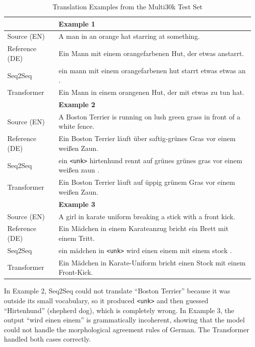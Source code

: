 \documentclass[12pt,a4paper]{article}
\begin{document}
\begin{table}[H]
    \centering
    \caption{Translation Examples from the Multi30k Test Set}
    \begin{tabular}{lp{9.5cm}}
        \toprule
        & \textbf{Example 1} \\
        \midrule
        Source (EN)    & A man in an orange hat starring at something. \\
        Reference (DE) & Ein Mann mit einem orangefarbenen Hut, der etwas anstarrt. \\
        Seq2Seq        & ein mann mit einem orangefarbenen hut starrt etwas etwas an . \\
        Transformer    & Ein Mann in einem orangenen Hut, der mit etwas zu tun hat. \\
        \midrule
        & \textbf{Example 2} \\
        \midrule
        Source (EN)    & A Boston Terrier is running on lush green grass in front of a white fence. \\
        Reference (DE) & Ein Boston Terrier l\"{a}uft \"{u}ber saftig-gr\"{u}nes Gras vor einem wei{\ss}en Zaun. \\
        Seq2Seq        & ein \texttt{<unk>} hirtenhund rennt auf gr\"{u}nes gr\"{u}nes gras vor einem wei{\ss}en zaun . \\
        Transformer    & Ein Boston Terrier l\"{a}uft auf \"{u}ppig gr\"{u}nem Gras vor einem wei{\ss}en Zaun. \\
        \midrule
        & \textbf{Example 3} \\
        \midrule
        Source (EN)    & A girl in karate uniform breaking a stick with a front kick. \\
        Reference (DE) & Ein M\"{a}dchen in einem Karateanzug bricht ein Brett mit einem Tritt. \\
        Seq2Seq        & ein m\"{a}dchen in \texttt{<unk>} wird einen einem mit einem stock . \\
        Transformer    & Ein M\"{a}dchen in Karate-Uniform bricht einen Stock mit einem Front-Kick. \\
        \bottomrule
    \end{tabular}
    \label{tab:q4_example}
\end{table}

In Example 2, Seq2Seq could not translate ``Boston Terrier'' because it was
outside its small vocabulary, so it produced \texttt{<unk>} and then guessed
``Hirtenhund'' (shepherd dog), which is completely wrong. In Example 3, the
output ``wird einen einem'' is grammatically incoherent, showing that the model
could not handle the morphological agreement rules of German. The Transformer
handled both cases correctly.
\end{document}
